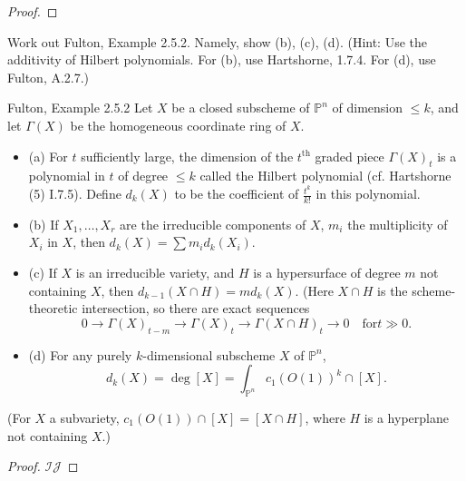 \begin{proof}

\end{proof}

Work out Fulton, Example 2.5.2. Namely, show (b), (c), (d). (Hint: Use the additivity of Hilbert polynomials. For (b), use Hartshorne, 1.7.4. For (d), use Fulton, A.2.7.) 

\begin{example}
Fulton, Example 2.5.2 Let $X$ be a closed subscheme of $\mathbb{P}^n$ of dimension $\leq k$, and let $\Gamma \left(X\right)$ be the homogeneous coordinate ring of $X$.

 \begin{itemize}
 \item (a) For $t$ sufficiently large, the dimension of the $t^{\text{th}}$ graded piece $\Gamma \left(X\right)_t$ is a polynomial in $t$ of degree $\leq k$ called the Hilbert polynomial (cf. Hartshorne (5) I.7.5). Define $d_k \left(X\right)$ to be the coefficient of $\frac{t^k}{k !}$ in this polynomial.
 \item (b) If $X_1 , \ldots , X_r$ are the irreducible components of $X$, $m_i$ the multiplicity of $X_i$ in $X$, then $d_k \left(X\right) = \sum m_i d_k \left(X_i\right)$.
 \item (c) If $X$ is an irreducible variety, and $H$ is a hypersurface of degree $m$ not containing $X$, then $d_{k - 1} \left(X \cap H\right) = m d_k \left(X\right)$. (Here $X \cap H$ is the scheme-theoretic intersection, so there are exact sequences \[
0 \rightarrow \Gamma(X)_{t - m} \rightarrow \Gamma(X)_t \rightarrow \Gamma(X \cap H)_t \rightarrow 0 \quad \text{for} t \gg 0 .
\]
 \item (d) For any purely $k$-dimensional subscheme $X$ of $\mathbb{P}^n$, \[
d_k \left(X\right) = \deg\left[X\right] = \int_{\mathbb{P}^n} c_1 \left(O\left(1\right)\right)^k \cap \left[X\right].
\]
 \end{itemize}
(For $X$ a subvariety, $c_1 \left(O\left(1\right)\right) \cap \left[X\right] = \left[X \cap H\right]$, where $H$ is a hyperplane not containing $X$.) \end{example}

\begin{proof}
$\mathcal{I} \mathcal{J}$ \end{proof}